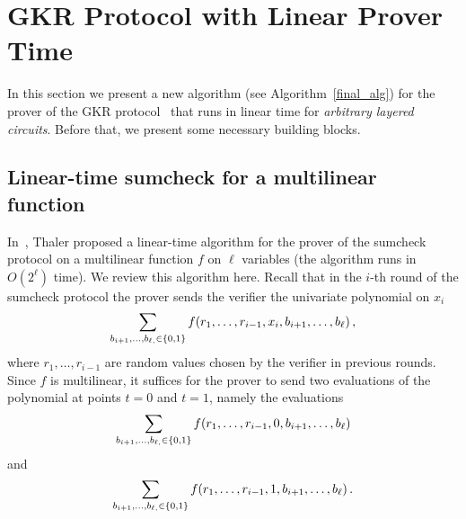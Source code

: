 \section{GKR Protocol with Linear Prover Time}
\label{sec::gkrlin}

In this section we present a new algorithm (see Algorithm~\ref{final_alg}) for the prover of the GKR protocol~\cite{GKR} that runs in linear time for \emph{arbitrary layered circuits}. Before that, we present some necessary building blocks.

\subsection{Linear-time sumcheck for a multilinear function~\cite{JT_Thesis}}
In~\cite{JT_Thesis}, Thaler proposed a linear-time algorithm for the prover of the sumcheck protocol on a multilinear function $f$ on $\ell$ variables (the algorithm runs in $O(2^\ell)$ time). We review this algorithm here. Recall that in the $i$-th round of the sumcheck protocol the prover sends the verifier the univariate polynomial on $x_i$ $$\sum_{b_{i+1}, \ldots,b_{\ell, }\in\{0,1\}}f(r_1,\ldots, r_{i-1}, x_{i}, b_{i+1},\ldots, b_{\ell})\, ,$$
where $r_1, \ldots, r_{i-1}$ are random values chosen by the verifier in previous rounds. Since $f$ is multilinear, it suffices for the prover to send two evaluations of the polynomial at points $t = 0$ and $t=1$, namely the evaluations
\begin{equation}\label{0-message}
\sum_{b_{i+1}, \ldots,b_{\ell, }\in\{0,1\}}f(r_1,\ldots, r_{i-1}, 0, b_{i+1},\ldots, b_{\ell})
\end{equation} and  
\begin{equation}\label{1-message}
\sum_{b_{i+1}, \ldots,b_{\ell, }\in\{0,1\}}f(r_1,\ldots, r_{i-1}, 1, b_{i+1},\ldots, b_{\ell})\,.
\end{equation}



